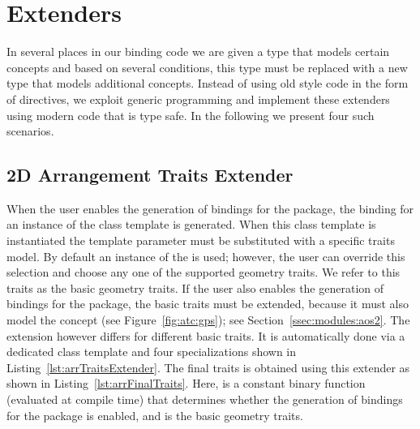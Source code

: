 \section{Extenders}
\label{sec:extenders}
In several places in our binding code we are given a type that models
certain concepts and based on several conditions, this type must be replaced 
with a new type that models additional concepts. Instead of using old style 
code in the form of  directives, we 
exploit generic programming and implement these extenders using modern code 
that is type safe. In the following we present four such scenarios.

\subsection{2D Arrangement Traits Extender}
\label{sec:extenders:arrTraits}
When the user enables the generation of bindings for the 
\iiDArrangementsPackage{} package, the binding for an instance of the class
template  is generated. When this
class template is instantiated the  template parameter 
must be substituted with a specific traits model. By default an instance of 
the  is used; however, the user 
can override this selection and choose any one of the supported geometry 
traits. We refer to this traits as the basic geometry traits. If the user 
also enables the generation of bindings for the 
\iiDRegularizedBooleanSetOperationsPackage{} package, the basic traits must
be extended, because it must also model the 
 concept 
(see Figure~\ref{fig:atc:gps}); see Section~\ref{ssec:modules:aos2}. The
extension however differs for different basic traits. It is automatically
done via a dedicated class template and four specializations shown in Listing~\ref{lst:arrTraitsExtender}. The final traits is obtained
using this extender as shown in Listing~\ref{lst:arrFinalTraits}. Here,
 is a constant binary
function (evaluated at compile time) that determines whether the generation 
of bindings for the 
\iiDRegularizedBooleanSetOperationsPackage{} package is enabled, and
 is the basic geometry traits.

